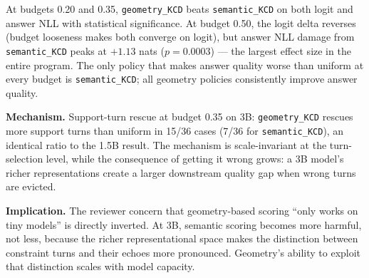 \documentclass[conference]{IEEEtran}
\begin{document}
At budgets 0.20 and 0.35, \texttt{geometry\_KCD} beats \texttt{semantic\_KCD} on both logit and answer NLL with statistical significance. At budget 0.50, the logit delta reverses (budget looseness makes both converge on logit), but answer NLL damage from \texttt{semantic\_KCD} peaks at $+1.13$ nats ($p=0.0003$) --- the largest effect size in the entire program. The only policy that makes answer quality worse than uniform at every budget is \texttt{semantic\_KCD}; all geometry policies consistently improve answer quality.

\begin{table}[t]
    \centering
    \caption{3B answer NLL relative to uniform at each budget. Negative = better than uniform. \texttt{semantic\_KCD} is the only policy that harms answer quality at every budget.}
    \label{tab:exp4_nll}
\end{table}

\textbf{Mechanism.} Support-turn rescue at budget 0.35 on 3B: \texttt{geometry\_KCD} rescues more support turns than uniform in 15/36 cases (7/36 for \texttt{semantic\_KCD}), an identical ratio to the 1.5B result. The mechanism is scale-invariant at the turn-selection level, while the consequence of getting it wrong grows: a 3B model's richer representations create a larger downstream quality gap when wrong turns are evicted.

\textbf{Implication.} The reviewer concern that geometry-based scoring ``only works on tiny models'' is directly inverted. At 3B, semantic scoring becomes more harmful, not less, because the richer representational space makes the distinction between constraint turns and their echoes more pronounced. Geometry's ability to exploit that distinction scales with model capacity.
\end{document}
